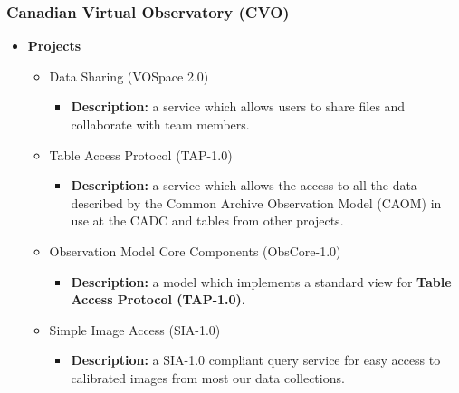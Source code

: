 \documentclass[11pt]{article}
\begin{document}
            \subsubsection{Canadian Virtual Observatory (CVO)}
                \begin{itemize}
                    \item \textbf{Projects}
                        \begin{itemize}
                            \item Data Sharing (VOSpace 2.0)
                                \begin{itemize}
                                    \item \textbf{Description:} a service which
allows users to share files and collaborate with team members. 
                                \end{itemize}
                            \item Table Access Protocol (TAP-1.0)
                                \begin{itemize}
                                    \item \textbf{Description:} a service which
allows the access to all the data described by the Common Archive Observation
Model (CAOM) in use at the CADC and tables from other projects.
                                \end{itemize}
                            \item Observation Model Core Components
(ObsCore-1.0)
                                \begin{itemize}
                                    \item \textbf{Description:} a model which
implements a standard view for \textbf{Table Access Protocol (TAP-1.0)}.
                                \end{itemize}
                            \item Simple Image Access (SIA-1.0)
                                \begin{itemize}
                                    \item \textbf{Description:} a SIA-1.0
compliant query service for easy access to calibrated images from most our data
collections.
                                \end{itemize}
                        \end{itemize}
                \end{itemize}
\end{document}
